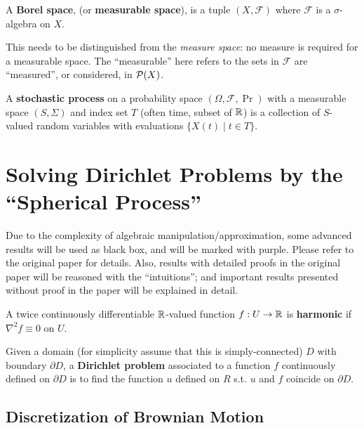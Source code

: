 \documentclass[10pt]{article}
\begin{document}
\begin{definition}
    A \textbf{Borel space}, (or \textbf{measurable space}), is a tuple $(X, \mathcal{F})$ where $\mathcal{F}$ is a $\sigma$-algebra on $X$.
\end{definition}
\nogap
\begin{remark}
    This needs to be distinguished from the \emph{measure space}: no measure is required for a measurable space. The ``measurable'' here refers to the sets in $\mathcal{F}$ are ``measured'', or considered, in $\P(X)$.
\end{remark}

\begin{definition}
    A \textbf{stochastic process} on a probability space $(\Omega, \mathcal{F}, \Pr)$ with a measurable space $(S, \Sigma)$ and index set $T$ (often time, subset of $\R$) is a collection of $S$-valued random variables with evaluations $\{ X(t) \mid t \in T \}$.
\end{definition}

\section{Solving Dirichlet Problems by the ``Spherical Process'' \cite{WalkOnSphere}}

Due to the complexity of algebraic manipulation/approximation, some advanced results will be used as black box, and will be marked with {\color{darkpurple} purple}. Please refer to the original paper for details. Also, results with detailed proofs in the original paper will be reasoned with the ``intuitions''; and important results presented without proof in the paper will be explained in detail. 

\begin{definition}\label{def: harmonic function}
    A twice continuously differentiable $\R$-valued function $f: U \to \R$ is \textbf{harmonic} if $\nabla^2 f \equiv 0$ on $U$.
\end{definition}
\nogap
\begin{definition}
    Given a domain (for simplicity assume that this is simply-connected) $D$ with boundary $\partial D$, a \textbf{Dirichlet problem} associated to a function $f$ continuously defined on $\partial D$ is to find the function $u$ defined on $R$ s.t. $u$ and $f$ coincide on $\partial D$.
\end{definition}

\subsection{Discretization of Brownian Motion}
\end{document}
